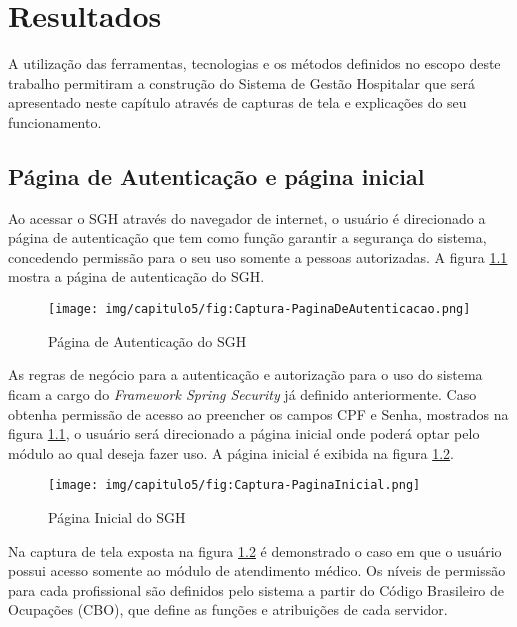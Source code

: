 \chapter{Resultados}

A utilização das ferramentas, tecnologias e os métodos definidos no escopo deste trabalho permitiram a construção do Sistema de Gestão Hospitalar que será apresentado neste capítulo através de capturas de tela e explicações do seu funcionamento.

\section{Página de Autenticação e página inicial}

Ao acessar o SGH através do navegador de internet, o usuário é direcionado a página de autenticação que tem como função garantir a segurança do sistema, concedendo permissão para o seu uso somente a pessoas autorizadas. A figura \ref{fig:Captura-PaginaDeAutenticacao} mostra a página de autenticação do SGH.

\begin{figure}[H]
    \centering
     \caption{Página de Autenticação do SGH}
    \texttt{[image: img/capitulo5/fig:Captura-PaginaDeAutenticacao.png]}
    \label{fig:Captura-PaginaDeAutenticacao}
\end{figure}

As regras de negócio para a autenticação e autorização para o uso do sistema ficam a cargo do \textit{Framework Spring Security} já definido anteriormente. Caso obtenha permissão de acesso ao preencher os campos CPF e Senha, mostrados na figura \ref{fig:Captura-PaginaDeAutenticacao}, o usuário será direcionado a página inicial onde poderá optar pelo módulo ao qual deseja fazer uso. A página inicial é exibida na figura \ref{fig:Captura-PaginaInicial}.

\begin{figure}[H]
    \centering
     \caption{Página Inicial do SGH}
    \texttt{[image: img/capitulo5/fig:Captura-PaginaInicial.png]}
    \label{fig:Captura-PaginaInicial}
\end{figure}

Na captura de tela exposta na figura \ref{fig:Captura-PaginaInicial} é demonstrado o caso em que o usuário possui acesso somente ao módulo de atendimento médico. Os níveis de permissão para cada profissional são definidos pelo sistema a partir do Código Brasileiro de Ocupações (CBO), que define as funções e atribuições de cada servidor. 

